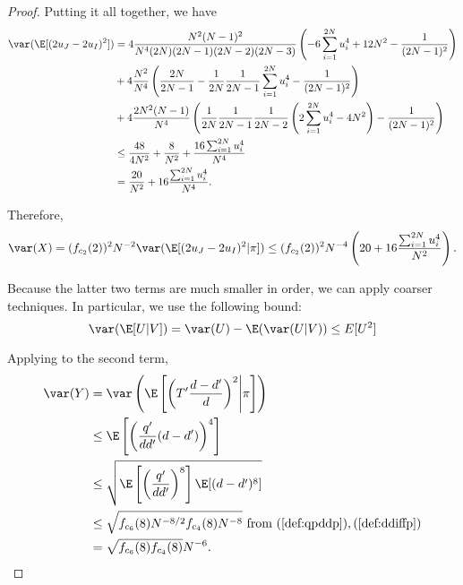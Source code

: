 \begin{proof}
  Putting it all together, we have 
  \begin{align*}
    \var (\E[(2u_J-2u_I)^2]) &= 4 \frac{N^2(N-1)^2}{N^4(2N)(2N-1)(2N-2)(2N-3)} \left ( -6
      \sum_{i=1}^{2N}u_i^4 + 12N^2 - \frac{1}{(2N-1)^2} \right ) \\
    &+ 4 \frac{N^2}{N^4} \left ( \frac{2N}{2N-1} -
    \frac{1}{2N}\frac{1}{2N-1}\sum_{i=1}^{2N}u_i^4 - \frac{1}{(2N-1)^2}
  \right ) \\
  &+ 4 \frac{2N^2(N-1)}{N^4} \left ( 
    \frac{1}{2N}\frac{1}{2N-1}\frac{1}{2N-2}\left (
      2 \sum_{i=1}^{2N} u_i^4 - 4N^2 \right ) - \frac{1}{(2N-1)^2}
  \right ) \\
  &\leq \frac{48}{4N^2} + \frac{8}{N^2} + \frac{16 \sum_{i=1}^{2N}
    u_i^4}{N^4} \\
  &= \frac{20}{N^2} + 16\frac{\sum_{i=1}^{2N} u_i^4}{N^4}.
  \end{align*}
  
  Therefore, 
  \begin{equation*}
    \var(X) = (f_{c_2}(2))^2 N^{-2} \var(\E [(2u_J-2u_I)^2 | \pi ])
    \leq (f_{c_2}(2))^2 N^{-4} \left (20 + 16\frac{\sum_{i=1}^{2N}
        u_i^4}{N^2} \right ).
  \end{equation*}
  
  Because the latter two terms are much smaller in order, we can apply
  coarser techniques.  In particular, we use the following bound:
  \begin{equation*}
    \var (\E[U|V]) = \var(U) - \E (\var (U|V)) \leq E[U^2]
  \end{equation*}

  Applying to the second term,
  \begin{align*}
    \var(Y) &= \var \left ( \E \left [ \left ( T'\frac{d-d'}{d} \right )^2
        \middle | \pi \right ] \right ) \\
    &\leq \E \left [ \left ( \frac{q'}{dd'} (d-d') \right )^4 \right ] \\
    &\leq \sqrt{\E \left [ \left ( \frac{q'}{dd'} \right )^8 \right ]
      \E [(d-d')^8]} \\
    &\leq \sqrt{f_{c_6}(8) N^{-8/2} f_{c_4}(8) N^{-8}} \text{ from }
    (\ref{def:qpddp}),(\ref{def:ddiffp}) \\
    &= \sqrt{f_{c_6}(8)f_{c_4}(8)}N^{-6}.
  \end{align*}


\end{proof}
